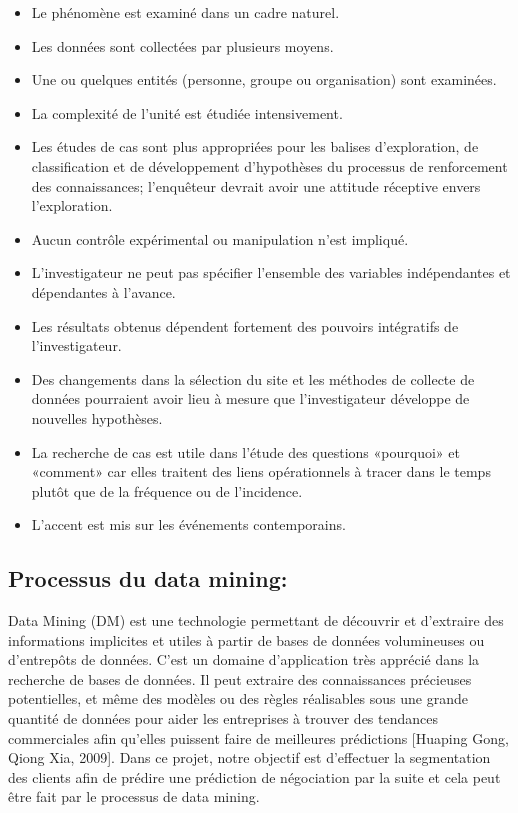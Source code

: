 \documentclass[12pt]{article}
\begin{document}
{\begin{itemize}
\item Le phénomène est examiné dans un cadre naturel.
\item Les données sont collectées par plusieurs moyens.
\item Une ou quelques entités (personne, groupe ou organisation) sont examinées.
\item La complexité de l'unité est étudiée intensivement.
\item Les études de cas sont plus appropriées pour les balises d'exploration, de classification et de développement d'hypothèses du processus de renforcement des connaissances; l'enquêteur devrait avoir une attitude réceptive envers l'exploration.
\item Aucun contrôle expérimental ou manipulation n'est impliqué.
\item L'investigateur ne peut pas spécifier l'ensemble des variables indépendantes et dépendantes à l'avance.
\item  Les résultats obtenus dépendent fortement des pouvoirs intégratifs de l'investigateur.
\item Des changements dans la sélection du site et les méthodes de collecte de données pourraient avoir lieu à mesure que l'investigateur développe de nouvelles hypothèses.
\item La recherche de cas est utile dans l'étude des questions «pourquoi» et «comment» car elles traitent des liens opérationnels à tracer dans le temps plutôt que de la fréquence ou de l'incidence.
\item L'accent est mis sur les événements contemporains.
\end{itemize}

\subsection{Processus du data mining:}
Data Mining (DM) est une technologie permettant de découvrir et d'extraire des informations implicites et utiles à partir de bases de données volumineuses ou d'entrepôts de données. C'est un domaine d'application très apprécié dans la recherche de bases de données. Il peut extraire des connaissances précieuses potentielles, et même des modèles ou des règles réalisables sous une grande quantité de données pour aider les entreprises à trouver des tendances commerciales afin qu'elles puissent faire de meilleures prédictions {\color{red}[Huaping Gong, Qiong Xia, 2009]}. Dans ce projet, notre objectif est d'effectuer la segmentation des clients  afin de prédire une prédiction de négociation par la suite et cela peut être fait par le processus de data mining.

}
\end{document}

